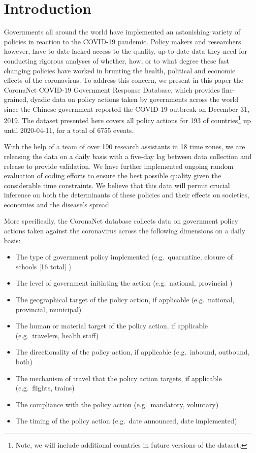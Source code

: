 \documentclass[]{article}
\providecommand{\tightlist}{%
  \setlength{\itemsep}{0pt}\setlength{\parskip}{0pt}}
\let\rmarkdownfootnote\footnote%
\def\footnote{\protect\rmarkdownfootnote}
\begin{document}
\hypertarget{introduction}{%
\section{Introduction}\label{introduction}}

Governments all around the world have implemented an astonishing variety of policies in reaction to the COVID-19 pandemic. Policy makers and researchers however, have to date lacked access to the quality, up-to-date data they need for conducting rigorous analyses of whether, how, or to what degree these fast changing policies have worked in brunting the health, political and economic effects of the coronavirus. To address this concern, we present in this paper the CoronaNet COVID-19 Government Response Database, which provides fine-grained, dyadic data on policy actions taken by governments across the world since the Chinese government reported the COVID-19 outbreak on December 31, 2019. The dataset presented here covers all policy actions for 193 of countries\footnote{Note, we will include additional countries in future versions of the dataset.} up until 2020-04-11, for a total of 6755 events.

With the help of a team of over 190 research assistants in 18 time zones, we are releasing the data on a daily basis with a five-day lag between data collection and release to provide validation. We have further implemented ongoing random evaluation of coding efforts to ensure the best possible quality given the considerable time constraints. We believe that this data will permit crucial inference on both the determinants of these policies and their effects on societies, economies and the disease's spread.

More specifically, the CoronaNet database collects data on government policy actions taken against the coronavirus across the following dimensions on a daily basis:

\begin{itemize}
\tightlist
\item
  The type of government policy implemented (e.g.~quarantine, closure of schools {[}16 total{]} )
\item
  The level of government initiating the action (e.g.~national, provincial )
\item
  The geographical target of the policy action, if applicable (e.g.~national, provincial, municipal)
\item
  The human or material target of the policy action, if applicable (e.g.~travelers, health staff)
\item
  The directionality of the policy action, if applicable (e.g.~inbound, outbound, both)
\item
  The mechanism of travel that the policy action targets, if applicable (e.g.~flights, trains)
\item
  The compliance with the policy action (e.g.~mandatory, voluntary)
\item
  The timing of the policy action (e.g.~date announced, date implemented)
\end{itemize}
\end{document}
